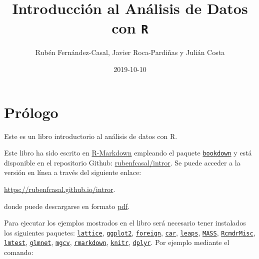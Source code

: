 \documentclass[]{book}
\title{Introducción al Análisis de Datos con \texttt{R}}
\author{Rubén Fernández-Casal, Javier Roca-Pardiñas y Julián Costa}
\date{2019-10-10}
\begin{document}
\maketitle

{
\setcounter{tocdepth}{1}
\tableofcontents
}
\hypertarget{prologo}{%
\chapter*{Prólogo}\label{prologo}}

Este es un libro introductorio al análisis de datos con R.

Este libro ha sido escrito en \href{http://rmarkdown.rstudio.com}{R-Markdown} empleando el paquete \href{https://bookdown.org/yihui/bookdown/}{\texttt{bookdown}} y está disponible en el repositorio Github: \href{https://github.com/rubenfcasal/book_remuestreo}{rubenfcasal/intror}.
Se puede acceder a la versión en línea a través del siguiente enlace:

\url{https://rubenfcasal.github.io/intror}.

donde puede descargarse en formato \href{https://rubenfcasal.github.io/intror/Intro_Analisis_Datos_R.pdf}{pdf}.

Para ejecutar los ejemplos mostrados en el libro será necesario tener instalados los siguientes paquetes:
\href{https://cran.r-project.org/web/packages/lattice/index.html}{\texttt{lattice}},
\href{https://cran.r-project.org/web/packages/ggplot2/index.html}{\texttt{ggplot2}},
\href{https://cran.r-project.org/web/packages/foreign/index.html}{\texttt{foreign}},
\href{https://cran.r-project.org/web/packages/car/index.html}{\texttt{car}},
\href{https://cran.r-project.org/web/packages/leaps/index.html}{\texttt{leaps}},
\href{https://cran.r-project.org/web/packages/MASS/index.html}{\texttt{MASS}},
\href{https://cran.r-project.org/web/packages/RcmdrMisc/index.html}{\texttt{RcmdrMisc}},
\href{https://cran.r-project.org/web/packages/lmtest/index.html}{\texttt{lmtest}},
\href{https://cran.r-project.org/web/packages/glmnet/index.html}{\texttt{glmnet}},
\href{https://cran.r-project.org/web/packages/mgcv/index.html}{\texttt{mgcv}},
\href{https://cran.r-project.org/web/packages/rmarkdown/index.html}{\texttt{rmarkdown}},
\href{https://cran.r-project.org/web/packages/knitr/index.html}{\texttt{knitr}},
\href{https://cran.r-project.org/web/packages/dplyr/index.html}{\texttt{dplyr}}.
Por ejemplo mediante el comando:
\end{document}
